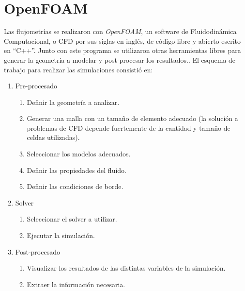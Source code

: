 \section{OpenFOAM}
%
Las flujometrías se realizaron con \emph{OpenFOAM}, un software de
Fluidodinámica Computacional, o CFD por sus siglas en inglés, de código libre y
abierto escrito en ``C++''.
%
%
Junto con este programa se utilizaron otras herramientas libres para generar la
geometría a modelar y post-procesar los resultados..
%
El esquema de trabajo para realizar las simulaciones consistió en:

\begin{enumerate}
    \item Pre-procesado

        \begin{enumerate}
            \item Definir la geometría a analizar.
            \item Generar una malla con un tamaño de elemento adecuado (la
solución a problemas de CFD depende fuertemente de la cantidad y tamaño de
celdas utilizadas).
            \item Seleccionar los modelos adecuados.
            \item Definir las propiedades del fluido.
            \item Definir las condiciones de borde.

        \end{enumerate}
    \item Solver
    \begin{enumerate} \item Seleccionar el solver a utilizar.
            \item Ejecutar la simulación.
    \end{enumerate}
\item Post-procesado
    \begin{enumerate}
        \item Visualizar los resultados de las distintas variables de la
            simulación.
        \item Extraer la información necesaria.
    \end{enumerate}
\end{enumerate}

